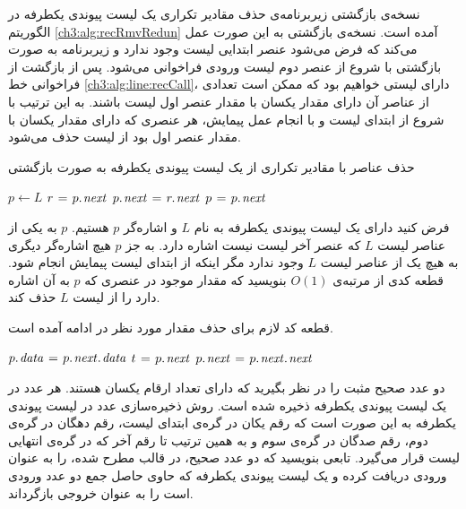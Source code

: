 نسخه‌ی بازگشتی زیربرنامه‌ی حذف مقادیر تکراری یک لیست پیوندی یکطرفه در الگوریتم {\eqref{ch3:alg:recRmvRedun}} آمده است. نسخه‌ی بازگشتی به این صورت عمل می‌کند که فرض می‌شود عنصر ابتدایی لیست وجود ندارد و زیربرنامه به صورت بازگشتی با شروع از عنصر دوم لیست ورودی فراخوانی می‌شود. پس از بازگشت از فراخوانی خط {\ref{ch3:alg:line:recCall}}، دارای لیستی خواهیم بود که ممکن است تعدادی از عناصر آن دارای مقدار یکسان با مقدار عنصر اول لیست باشند. به این ترتیب با شروع از ابتدای لیست و با انجام عمل پیمایش، هر عنصری که دارای مقدار یکسان با مقدار عنصر اول بود از لیست حذف می‌شود.
\begin{algorithm}
\caption{حذف عناصر با مقادیر تکراری از یک لیست پیوندی یکطرفه به صورت بازگشتی}\label{ch3:alg:recRmvRedun}
\begin{latin}
\begin{algorithmic}[1]
				\State	\Return
		\EndIf
		\State	{}\label{ch3:alg:line:recCall}
		\State	$p \gets L$
						\State	$r \mathrel{\hspace{1pt}=\hspace{1pt}} p.\hspace*{1pt}\mathit{next}$
						\State	$p.\hspace*{1pt}\mathit{next} \mathrel{\hspace{1pt}=\hspace{1pt}} r.\hspace*{1pt}\mathit{next}$
						\State	{}
				\Else
						\State	$p \mathrel{\hspace{1pt}=\hspace{1pt}} p.\hspace*{1pt}\mathit{next}$
				\EndIf
		\EndWhile			
\EndProcedure
\end{algorithmic}
\end{latin}
\end{algorithm}

 فرض کنید دارای یک لیست پیوندی یکطرفه به نام {$L$} و اشاره‌گر {$p$} هستیم. {$p$} به یکی از عناصر لیست {$L$} که عنصر آخر لیست نیست اشاره دارد. به جز {$p$} هیچ اشاره‌گر دیگری به هیچ یک از عناصر لیست {$L$} وجود ندارد مگر اینکه از ابتدای لیست پیمایش انجام شود. قطعه کدی از مرتبه‌ی {$O(1)$} بنویسید که مقدار موجود در عنصری که {$p$} به آن اشاره دارد را از لیست {$L$} حذف کند.


قطعه کد لازم برای حذف مقدار مورد نظر در ادامه آمده است.
\begin{latin}
\begin{algorithmic}[1]
		\State	$p.\hspace*{1pt}\mathit{data} \mathrel{\hspace{1pt}=\hspace{1pt}} p.\hspace*{1pt}\mathit{next}.\hspace*{1pt}\mathit{data}$
		\State	$t \mathrel{\hspace{1pt}=\hspace{1pt}} p.\hspace*{1pt}\mathit{next}$
		\State	$p.\hspace*{1pt}\mathit{next} \mathrel{\hspace{1pt}=\hspace{1pt}} p.\hspace*{1pt}\mathit{next}.\hspace*{1pt}\mathit{next}$
		\State	{}
\end{algorithmic}
\end{latin}

 دو عدد صحیح مثبت را در نظر بگیرید که دارای تعداد ارقام یکسان هستند. هر عدد در یک لیست پیوندی یکطرفه ذخیره شده‌ است. روش ذخیره‌سازی عدد در لیست پیوندی یکطرفه به این صورت است که رقم یکان در گره‌ی ابتدای لیست، رقم دهگان در گره‌ی دوم، رقم صدگان در گره‌ی سوم و به همین ترتیب تا رقم آخر که در گره‌ی انتهایی لیست قرار می‌گیرد. تابعی بنویسید که دو عدد صحیح، در قالب مطرح شده، را به عنوان ورودی دریافت کرده و یک لیست پیوندی یکطرفه که حاوی حاصل جمع دو عدد ورودی است را به عنوان خروجی بازگرداند.

